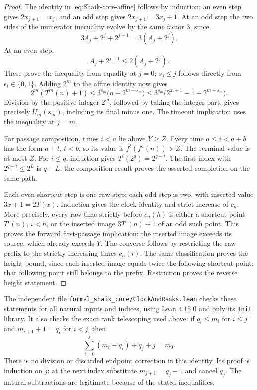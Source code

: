 \begin{proof}
The identity in \eqref{eq:Shaik-core-affine} follows by induction:
an even step gives \(2x_{j+1}=x_j\), and an odd step gives
\(2x_{j+1}=3x_j+1\). At an odd step the two sides of the
numerator inequality evolve by the same factor \(3\), since
\[
 3A_j+2^j+2^{j+1}=3(A_j+2^j).
\]
At an even step,
\[
 A_j+2^{j+1}\le2(A_j+2^j).
\]
These prove the inequality from equality at \(j=0\); \(s_j\le j\)
follows directly from \(\epsilon_i\in\{0,1\}\).
Adding \(2^m\) to the affine identity now gives
\[
 2^m(T^m(n)+1)
 \le 3^{s_m}\bigl(n+2^{m-s_m}\bigr)
 \le 3^{s_m}\bigl(2^{m+1}-1+2^{m-s_m}\bigr).
\]
Division by the positive integer \(2^m\), followed by taking the
integer part, gives precisely \(U_m(s_m)\), including its final
minus one. The timeout implication uses the inequality at \(j=m\).

For passage composition, times \(i<a\) lie above \(Y\ge Z\).
Every time \(a\le i<a+b\) has the form \(a+t\), \(t<b\), so
its value is \(f^t(f^a(n))>Z\). The terminal value is at most \(Z\).
For \(i\le q\), induction gives \(T^i(2^q)=2^{q-i}\).
The first index with \(2^{q-i}\le2^L\) is \(q-L\);
the composition result proves the asserted completion on the same path.

Each even shortcut step is one raw step; each odd step is two,
with inserted value \(3x+1=2T(x)\).
Induction gives the clock identity and strict increase of \(c_n\).
More precisely, every raw time strictly before \(c_n(h)\) is either
a shortcut point \(T^i(n)\), \(i<h\), or the inserted image
\(3T^i(n)+1\) of an odd such point. This proves the forward
first-passage implication: the inserted image exceeds its source,
which already exceeds \(Y\). The converse follows by restricting
the raw prefix to the strictly increasing times \(c_n(i)\).
The same classification proves the height bound, since each inserted
image equals twice the following shortcut point; that following
point still belongs to the prefix. Restriction proves the reverse
height statement.
\end{proof}

The independent file \texttt{formal\_shaik\_core/ClockAndRanks.lean}
checks these statements for all natural inputs and indices, using
Lean \(4.15.0\) and only its \texttt{Init} library.
It also checks the exact rank telescoping used above:
if \(q_i\le m_i\) for \(i\le j\) and \(m_{i+1}+1=q_i\) for \(i<j\), then
\[
 \sum_{i=0}^j(m_i-q_i)+q_j+j=m_0.
\]
There is no division or discarded endpoint correction in this identity.
Its proof is induction on \(j\): at the next index substitute
\(m_{j+1}=q_j-1\) and cancel \(q_j\). The natural subtractions are
legitimate because of the stated inequalities.


